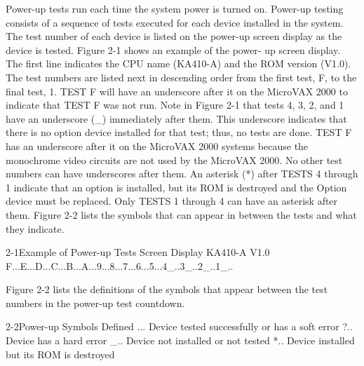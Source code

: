 Power-up tests run each time the system power is turned on. Power-up
testing consists of a sequence of tests executed for each device installed in
the system. The test number of each device is listed on the power-up screen
display as the device is tested. Figure 2-1 shows an example of the power-
up screen display. The first line indicates the CPU name (KA410-A) and the
ROM version (V1.0). The test numbers are listed next in descending order
from the first test, F, to the final test, 1. TEST F will have an underscore
after it on the MicroVAX 2000 to indicate that TEST F was not run. Note in
Figure 2-1 that tests 4, 3, 2, and 1 have an underscore (\_) immediately after
them. This underscore indicates that there is no option device installed for
that test; thus, no tests are done. TEST F has an underscore after it on the
MicroVAX 2000 systems because the monochrome video circuits are not
used by the MicroVAX 2000. No other test numbers can have underscores
after them. An asterisk (*) after TESTS 4 through 1 indicate that an option is
installed, but its ROM is destroyed and the Option device must be replaced.
Only TESTS 1 through 4 can have an asterisk after them. Figure 2-2 lists
the symbols that can appear in between the tests and what they indicate.

\begin{ttfig}{2-1}{Example of Power-up Tests Screen Display}
KA410-A V1.0
F...E...D...C...B...A...9...8...7...6...5...4_..3_..2_..1_..
\end{ttfig}

Figure 2-2 lists the definitions of the symbols that appear between the test
numbers in the power-up test countdown.

\begin{ttfig}{2-2}{Power-up Symbols Defined}
    ...  Device tested successfully or has a soft error
    ?..  Device has a hard error
    _..  Device not installed or not tested
    *..  Device installed but its ROM is destroyed
\end{ttfig}

